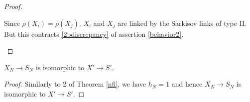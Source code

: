 \begin{proof}
\begin{enumerate}
          Since $\rho(X_{i})= \rho(X_{j})$, $X_{i}$  and $X_{j}$ are linked by  the Sarkisov links of type II. But this contracts  \ref{2bdiscrepancy} of  assertion \ref{behavior2}.
  \end{enumerate}
\end{proof}
\begin{prop}\label{nfi2}
  $X_{N}\to S_{N}$ is isomorphic to $X'\to S'$.
\end{prop}
\begin{proof}
  Similarly to 2 of Theorem \ref{nfi}, we have $h_{N}=1$ and hence $X_{N}\to S_{N}$ is isomorphic to $X'\to S'$.
\end{proof}
